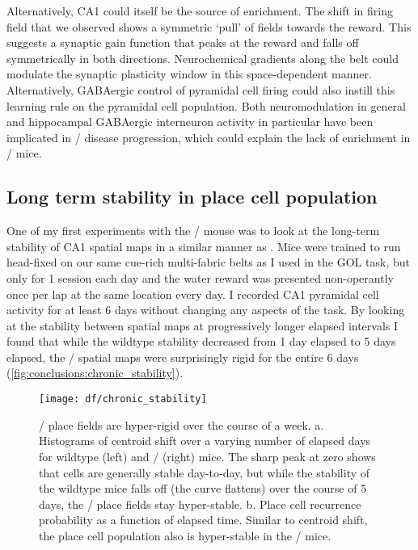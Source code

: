 Alternatively, CA1 could itself be the source of enrichment.
The shift in firing field that we observed shows a symmetric `pull' of fields towards the reward.
This suggests a synaptic gain function that peaks at the reward and falls off symmetrically in both directions. Neurochemical gradients along the belt could modulate the synaptic plasticity window in this space-dependent manner. Alternatively, GABAergic control of pyramidal cell firing could also instill this learning rule on the pyramidal cell population. Both neuromodulation in general and  hippocampal GABAergic interneuron activity in particular have been implicated in \scz/ disease progression, which could explain the lack of enrichment in \df/ mice.

\subsection{Long term stability in place cell population}
\label{sec:conclusions:chronic}
One of my first experiments with the \df/ mouse was to look at the long-term stability of CA1 spatial maps in a similar manner as \citeauthor{Ziv2013} \citep{Ziv2013}.
Mice were trained to run head-fixed on our same cue-rich multi-fabric belts as I used in the \ac{GOL} task, but only for 1 session each day and the water reward was presented non-operantly once per lap at the same location every day.
I recorded CA1 pyramidal cell activity for at least 6 days without changing any aspects of the task.
By looking at the stability between spatial maps at progressively longer elapsed intervals I found that while the wildtype stability decreased from 1 day elapsed to 5 days elapsed, the \df/ spatial maps were surprisingly rigid for the entire 6 days (\autoref{fig:conclusions:chronic_stability}).

\begin{figure}
	\centering
	\texttt{[image: df/chronic\_stability]}
	\caption[\df/ place fields are hyper-rigid over the course of a week]{\df/ place fields are hyper-rigid over the course of a week.
	a. Histograms of centroid shift over a varying number of elapsed days for wildtype (left) and \df/ (right) mice. The sharp peak at zero shows that cells are generally stable day-to-day, but while the stability of the wildtype mice falls off (the curve flattens) over the course of 5 days, the \df/ place fields stay hyper-stable.
	b. Place cell recurrence probability as a function of elapsed time. Similar to centroid shift, the place cell population also is hyper-stable in the \df/ mice.}
	\label{fig:conclusions:chronic_stability}
\end{figure}


